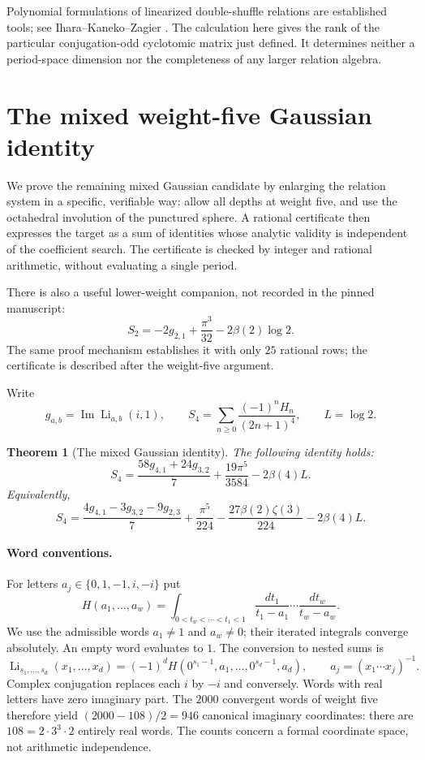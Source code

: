 \documentclass[11pt]{article}
\numberwithin{equation}{section}
\theoremstyle{plain}
\newtheorem{theorem}{Theorem}[section]
\theoremstyle{definition}
\theoremstyle{remark}
\begin{document}
Polynomial formulations of linearized double-shuffle relations are
established tools; see Ihara--Kaneko--Zagier \cite{IKZ}. The calculation
here gives the rank of the particular conjugation-odd cyclotomic matrix
just defined. It determines neither a period-space dimension nor the
completeness of any larger relation algebra.

\section{The mixed weight-five Gaussian identity}

We prove the remaining mixed Gaussian candidate by enlarging the relation
system in a specific, verifiable way: allow all depths at weight five, and
use the octahedral involution of the punctured sphere.  A rational certificate
then expresses the target as a sum of identities whose analytic validity is
independent of the coefficient search.  The certificate is checked by integer
and rational arithmetic, without evaluating a single period.

There is also a useful lower-weight companion, not recorded in the
pinned manuscript:
\[
 S_2=-2g_{2,1}+\frac{\pi^3}{32}-2\beta(2)\log2.
\]
The same proof mechanism establishes it with only $25$ rational rows;
the certificate is described after the weight-five argument.

Write
\[
 g_{a,b}=\operatorname{Im}\operatorname{Li}_{a,b}(i,1),\qquad
 S_4=\sum_{n\ge0}\frac{(-1)^nH_n}{(2n+1)^4},\qquad L=\log2.
\]
\begin{theorem}[The mixed Gaussian identity]\label{thm:S4}
The following identity holds:
\[
 S_4=\frac{58g_{4,1}+24g_{3,2}}7
       +\frac{19\pi^5}{3584}-2\beta(4)L.
\]
Equivalently,
\[
 S_4=\frac{4g_{4,1}-3g_{3,2}-9g_{2,3}}7
 +\frac{\pi^5}{224}-\frac{27\beta(2)\zeta(3)}{224}
 -2\beta(4)L.
\]
\end{theorem}

\paragraph{Word conventions.}
For letters $a_j\in\{0,1,-1,i,-i\}$ put
\[
 H(a_1,\ldots,a_w)=
 \int_{0<t_w<\cdots<t_1<1}
 \frac{dt_1}{t_1-a_1}\cdots\frac{dt_w}{t_w-a_w}.
\]
We use the admissible words $a_1\ne1$ and $a_w\ne0$; their iterated integrals converge absolutely.
An empty word evaluates to $1$.
The conversion to nested sums is
\[
 \operatorname{Li}_{s_1,\ldots,s_d}(x_1,\ldots,x_d)
 =(-1)^d H(0^{s_1-1},a_1,\ldots,0^{s_d-1},a_d),
 \qquad a_j=(x_1\cdots x_j)^{-1}.
\]
Complex conjugation replaces each $i$ by $-i$ and conversely.  Words
with real letters have zero imaginary part.  The $2000$ convergent words
of weight five therefore yield $(2000-108)/2=946$ canonical imaginary
coordinates: there are $108=2\cdot3^3\cdot2$ entirely real words.
The counts concern a formal coordinate space, not arithmetic independence.
\end{document}
